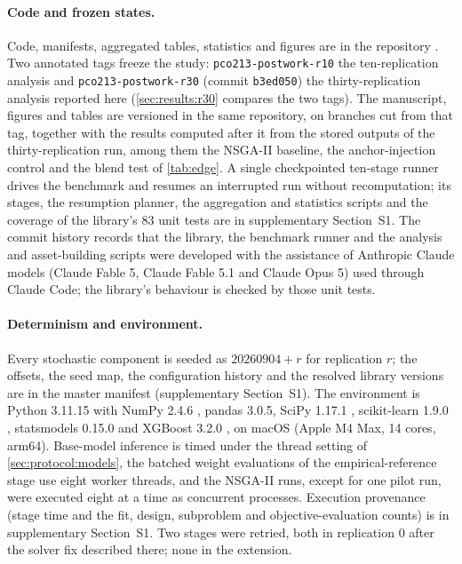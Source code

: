 \label{sec:repro}

\paragraph{Code and frozen states.} Code, manifests, aggregated tables, statistics and figures are in the repository
. Two annotated tags freeze the study: \texttt{pco213-\allowbreak postwork-\allowbreak r10}
the ten-replication analysis and \texttt{pco213-\allowbreak postwork-\allowbreak r30} (commit \texttt{b3ed050}) the
thirty-replication analysis reported here (\cref{sec:results:r30} compares the two tags). The manuscript, figures and
tables are versioned in the same repository, on branches cut from that tag, together with the results computed after
it from the stored outputs of the thirty-replication run, among them the NSGA-II baseline, the anchor-injection control and the blend test of
\cref{tab:edge}. A single checkpointed ten-stage runner drives the benchmark and
resumes an interrupted run without recomputation; its stages, the resumption planner, the aggregation and statistics
scripts and the coverage of the library's 83 unit tests are in supplementary Section~S1. The commit history records
that the library, the benchmark runner and the analysis and asset-building scripts were developed with the assistance
of Anthropic Claude models (Claude Fable 5, Claude Fable 5.1 and Claude Opus 5) used through Claude Code; the
library's behaviour is checked by those unit tests.

\paragraph{Determinism and environment.} Every stochastic component is seeded as $\text{20260904} + r$ for
replication $r$; the offsets, the seed map, the configuration history and the resolved library versions are in the
master manifest (supplementary Section~S1). The environment is Python 3.11.15 with NumPy 2.4.6 \citep{harris2020numpy}, pandas 3.0.5,
SciPy 1.17.1 \citep{virtanen2020scipy}, scikit-learn 1.9.0 \citep{pedregosa2011scikit}, statsmodels 0.15.0 and
XGBoost 3.2.0 \citep{chen2016xgboost}, on macOS (Apple M4 Max, 14 cores, arm64). Base-model inference is timed under the thread setting of \cref{sec:protocol:models}, the batched weight evaluations of the empirical-reference stage use eight worker threads, and the NSGA-II runs, except for one pilot run, were executed eight at a time as concurrent processes. Execution provenance (stage time and the fit, design, subproblem and objective-evaluation counts) is in
supplementary Section~S1. Two stages were retried, both in replication 0 after the solver fix described there; none in the extension.

